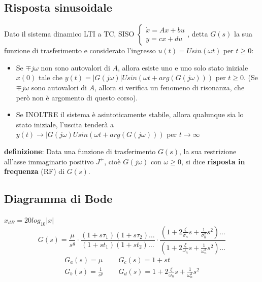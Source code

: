 \begin{landscape}
\begin{multicols*}{3}
    \subsection*{Risposta sinusoidale}
    Dato il sistema dinamico LTI a TC, SISO $\begin{cases}
        \dot{x} = Ax +bu\\ 
        y = cx +du
    \end{cases}$, detta $G(s)$ la sua funzione di trasferimento e considerato l'ingresso $u(t) = U sin(\omega t)$ per $t\geq 0$:
    \begin{itemize}
        \item Se $\mp j \omega$ non sono autovalori di $A$, allora esiste uno e uno solo stato iniziale $x(0)$ tale che $y(t) = |G(j \omega)| U sin(\omega t + arg(G(j \omega)))$ per $t\geq 0$. (Se $\mp j \omega$ sono autovalori di $A$, allora si verifica un fenomeno di risonanza, che però non è argomento di questo corso).
        \item Se INOLTRE il sistema è asintoticamente stabile, allora qualunque sia lo stato iniziale, l'uscita  tenderà a $y(t) \rightarrow |G(j \omega) U sin( \omega t + arg(G(j \omega)))$ per $t \rightarrow  \infty$
    \end{itemize}
    \textbf{definizione}:  Data una funzione di trasferimento $G(s)$, la sua restrizione all'asse immaginario positivo $J^+$, cioè $G(j \omega)$ con $\omega \geq 0$, si dice \textbf{risposta in frequenza} (RF) di $G(s)$.
    \subsection*{Diagramma di Bode}
    $x_{dB} = 20 log_{10}|x|$\newline
    \[
        G(s) = \frac{\mu}{s^g} \cdot \frac{(1 + s \tau_1)(1 + s \tau_2)\dots}{(1 + s t_1)(1 + s t_2)\dots} \cdot \frac{(1 + 2 \frac{\zeta}{\sigma_n}s + \frac{1}{\sigma_n^2}s^2)\dots}{(1 + 2 \frac{\xi}{\omega_n} s + \frac{1}{\omega_n^2}s^2)\dots}
    \]
    \[
        \begin{matrix}
            G_a(s) = \mu & \;\; & G_c(s) = 1+ s t\\
            G_b(s) = \frac{1}{s^g} & \;\; & G_d(s) = 1 + 2 \frac{\xi}{\omega_n}s + \frac{1}{\omega_n^2}s^2
        \end{matrix}
    \]

\end{multicols*}
\end{landscape}
